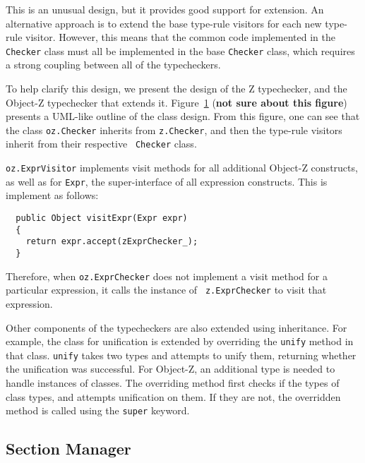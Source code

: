 \documentclass{llncs}
\begin{document}
This is an unusual design, but it provides good support for
extension. An alternative approach is to extend the base type-rule
visitors for each new type-rule visitor. However, this means that the
common code implemented in the {\tt Checker} class must all be
implemented in the base {\tt Checker} class, which requires a strong
coupling between all of the typecheckers.

To help clarify this design, we present the design of the Z
typechecker, and the Object-Z typechecker that extends
it. Figure~\ref{tc-design} ({\bf not sure about this figure}) presents
a UML-like outline of the class design. From this figure, one can see
that the class {\tt oz.Checker} inherits from {\tt z.Checker}, and
then the type-rule visitors inherit from their respective {\tt
Checker} class.

\def\epsfsize#1#2{0.70#1}
\begin{figure}[t]
\begin{center}
\label{tc-design}
\end{center}
\end{figure}
\def\epsfsize#1#2{\epsfxsize}

{\tt oz.ExprVisitor} implements visit methods for all additional
Object-Z constructs, as well as for {\tt Expr}, the super-interface of
all expression constructs. This is implement as follows:

\begin{verbatim}
  public Object visitExpr(Expr expr)
  {
    return expr.accept(zExprChecker_);
  }
\end{verbatim}

Therefore, when {\tt oz.ExprChecker} does not implement a visit method
for a particular expression, it calls the instance of {\tt
  z.ExprChecker} to visit that expression.

Other components of the typecheckers are also extended using
inheritance. For example, the class for unification is extended by
overriding the {\tt unify} method in that class. {\tt unify} takes two
types and attempts to unify them, returning whether the unification
was successful. For Object-Z, an additional type is needed to handle
instances of classes. The overriding method first checks if the types
of class types, and attempts unification on them. If they are not, the
overridden method is called using the {\tt super} keyword.


\subsection{Section Manager}
\end{document}
